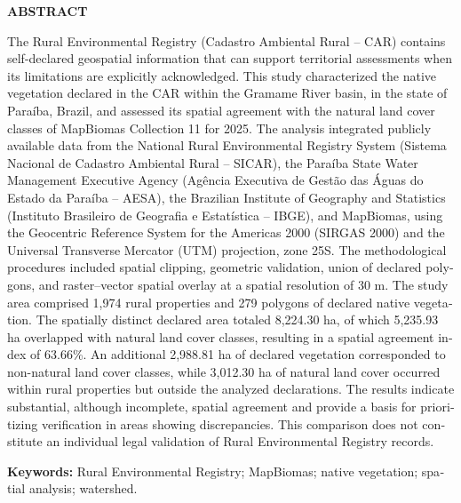 \documentclass[12pt,oneside,a4paper,brazilian,english,fleqn]{abntex2}
\begin{document}
\cleardoublepage
\begin{otherlanguage}{english}
\begin{center}
{\bfseries\fontsize{12}{14.4}\selectfont ABSTRACT}
\end{center}
\vspace{1.5\baselineskip}
The Rural Environmental Registry (Cadastro Ambiental Rural – CAR) contains self-declared geospatial information that can support territorial assessments when its limitations are explicitly acknowledged. This study characterized the native vegetation declared in the CAR within the Gramame River basin, in the state of Paraíba, Brazil, and assessed its spatial agreement with the natural land cover classes of MapBiomas Collection 11 for 2025. The analysis integrated publicly available data from the National Rural Environmental Registry System (Sistema Nacional de Cadastro Ambiental Rural – SICAR), the Paraíba State Water Management Executive Agency (Agência Executiva de Gestão das Águas do Estado da Paraíba – AESA), the Brazilian Institute of Geography and Statistics (Instituto Brasileiro de Geografia e Estatística – IBGE), and MapBiomas, using the Geocentric Reference System for the Americas 2000 (SIRGAS 2000) and the Universal Transverse Mercator (UTM) projection, zone 25S. The methodological procedures included spatial clipping, geometric validation, union of declared polygons, and raster–vector spatial overlay at a spatial resolution of 30 m. The study area comprised 1,974 rural properties and 279 polygons of declared native vegetation. The spatially distinct declared area totaled 8,224.30 ha, of which 5,235.93 ha overlapped with natural land cover classes, resulting in a spatial agreement index of 63.66\%. An additional 2,988.81 ha of declared vegetation corresponded to non-natural land cover classes, while 3,012.30 ha of natural land cover occurred within rural properties but outside the analyzed declarations. The results indicate substantial, although incomplete, spatial agreement and provide a basis for prioritizing verification in areas showing discrepancies. This comparison does not constitute an individual legal validation of Rural Environmental Registry records.

\vspace{1.0\baselineskip}
\noindent\textbf{Keywords:} Rural Environmental Registry; MapBiomas; native vegetation; spatial analysis; watershed.
\end{otherlanguage}
\cleardoublepage
\end{document}
